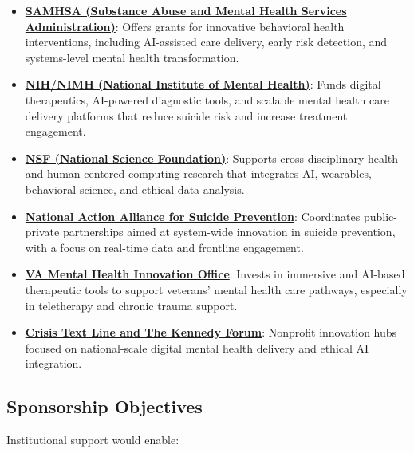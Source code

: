 \begin{itemize}
  \item \textbf{\href{https://www.samhsa.gov/grants}{SAMHSA (Substance Abuse and Mental Health Services Administration)}}\cite{samhsa_grants}: Offers grants for innovative behavioral health interventions, including AI-assisted care delivery, early risk detection, and systems-level mental health transformation.

  \item \textbf{\href{https://www.nimh.nih.gov/funding}{NIH/NIMH (National Institute of Mental Health)}}\cite{nimh_funding}: Funds digital therapeutics, AI-powered diagnostic tools, and scalable mental health care delivery platforms that reduce suicide risk and increase treatment engagement.

  \item \textbf{\href{https://www.nsf.gov/funding/opportunities}{NSF (National Science Foundation)}}\cite{nsf_funding}: Supports cross-disciplinary health and human-centered computing research that integrates AI, wearables, behavioral science, and ethical data analysis.

  \item \textbf{\href{https://theactionalliance.org}{National Action Alliance for Suicide Prevention}}\cite{action_alliance}: Coordinates public-private partnerships aimed at system-wide innovation in suicide prevention, with a focus on real-time data and frontline engagement.

  \item \textbf{\href{https://www.innovation.va.gov/hil/views/immersive/immersive-programs.html}{VA Mental Health Innovation Office}}\cite{va_innovation}: Invests in immersive and AI-based therapeutic tools to support veterans’ mental health care pathways, especially in teletherapy and chronic trauma support.

  \item \textbf{\href{https://www.crisistextline.org}{Crisis Text Line and The Kennedy Forum}}\cite{crisis_kennedy}: Nonprofit innovation hubs focused on national-scale digital mental health delivery and ethical AI integration.
\end{itemize}

\subsection*{Sponsorship Objectives}

Institutional support would enable:

